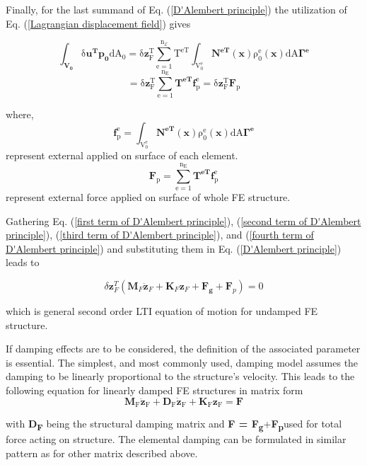 Finally, for the last summand of Eq. (\ref{D'Alembert principle})
the utilization of Eq. (\ref{Lagrangian displacement field}) gives

\begin{equation}
\mathrm{\int_{\mathbf{V_{0}}}\delta\mathbf{u^{T}}\mathbf{p_{0}}dA_{0}=\delta\mathbf{z}_{F}^{T}\sum_{e=1}^{n_{\mathcal{E}}}T^{eT}\int_{V_{0}^{e}}\mathbf{N^{eT}}(\mathbf{x})\rho_{0}^{e}(\mathbf{x})dA\mathbf{\Gamma^{e}}}
\end{equation}
\begin{equation}
\mathrm{\mathrm{=\delta\mathbf{z}_{F}^{T}\sum_{e=1}^{n_{E}}\mathbf{T^{eT}}\mathbf{f}_{p}^{e}=\delta\mathbf{z}_{F}^{T}\mathbf{F}_{p}}}\label{fourth term of D'Alembert principle}
\end{equation}


where,
\[
\mathrm{\mathbf{f}_{p}^{e}=\int_{V_{0}^{e}}\mathbf{N^{eT}}(\mathbf{x})\rho_{0}^{e}(\mathbf{x})dA\mathbf{\Gamma^{e}}}
\]
represent external applied on surface of each element.
\[
\mathrm{\mathbf{F}_{p}=\sum_{e=1}^{n_{E}}\mathbf{T^{eT}}\mathbf{f}_{p}^{e}}
\]
represent external force applied on surface of whole FE structure.

Gathering Eq. (\ref{first term of D'Alembert principle}), (\ref{second term of D'Alembert principle}),
(\ref{third term of D'Alembert principle}), and (\ref{fourth term of D'Alembert principle})
and substituting them in Eq. (\ref{D'Alembert principle}) leads to 

\begin{equation}
\delta\mathbf{z}_{F}^{T}(\mathbf{M}_{F}\ddot{\boldsymbol{z}}_{F}+\mathbf{K}_{F}\mathbf{z}_{F}+\mathbf{F_{g}}+\mathbf{F}_{p})=0\label{LTI equation of motion ... undamped}
\end{equation}


which is general second order LTI equation of motion for undamped
FE structure.

If damping effects are to be considered, the definition of the associated
parameter is essential. The simplest, and most commonly used, damping
model assumes the damping to be linearly proportional to the structure\textquoteright s
velocity. This leads to the following equation for linearly damped
FE structures in matrix form 
\begin{equation}
\mathrm{\mathbf{M}_{F}\ddot{\boldsymbol{z}}_{F}+\mathbf{D}_{F}\mathbf{\dot{z}}_{F}+\mathbf{K}_{F}\mathbf{z}_{F}=\mathbf{F}}
\end{equation}


with \textbf{D\textsubscript{\textbf{F}}} being the structural damping
matrix and \textbf{F = F\textsubscript{\textbf{g}}}+\textbf{F\textsubscript{\textbf{p}}}used
for total force acting on structure. The elemental damping can be
formulated in similar pattern as for other matrix described above.

